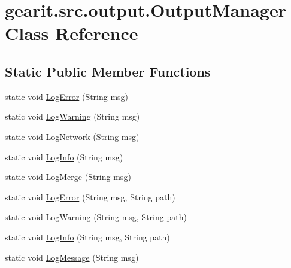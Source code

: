 \hypertarget{classgearit_1_1src_1_1output_1_1_output_manager}{\section{gearit.\+src.\+output.\+Output\+Manager Class Reference}
\label{classgearit_1_1src_1_1output_1_1_output_manager}
}
\subsection*{Static Public Member Functions}
\begin{DoxyCompactItemize}
\item 
static void \hyperlink{classgearit_1_1src_1_1output_1_1_output_manager_acaae4a30555bf4b8d36e772cc54f5bcd}{Log\+Error} (String msg)
\item 
static void \hyperlink{classgearit_1_1src_1_1output_1_1_output_manager_a40e0dc1925fae669404e6e531e73d7c2}{Log\+Warning} (String msg)
\item 
static void \hyperlink{classgearit_1_1src_1_1output_1_1_output_manager_a810c102fd25b7030d72a2890f0b2dd93}{Log\+Network} (String msg)
\item 
static void \hyperlink{classgearit_1_1src_1_1output_1_1_output_manager_a4636079e6a57dffaa54b96c746fd7054}{Log\+Info} (String msg)
\item 
static void \hyperlink{classgearit_1_1src_1_1output_1_1_output_manager_a0294b9d2ea9b9c2ff2d672536b801e29}{Log\+Merge} (String msg)
\item 
static void \hyperlink{classgearit_1_1src_1_1output_1_1_output_manager_a5e827d32b10cca4a1b497b614a5e21dd}{Log\+Error} (String msg, String path)
\item 
static void \hyperlink{classgearit_1_1src_1_1output_1_1_output_manager_a2a1d228658e27819e7147c2cdda82669}{Log\+Warning} (String msg, String path)
\item 
static void \hyperlink{classgearit_1_1src_1_1output_1_1_output_manager_a9479bcc3dbbdb9d67f3874b62acd2958}{Log\+Info} (String msg, String path)
\item 
static void \hyperlink{classgearit_1_1src_1_1output_1_1_output_manager_ad9a6879b84194c3ea438e84f65d2df83}{Log\+Message} (String msg)
\end{DoxyCompactItemize}


